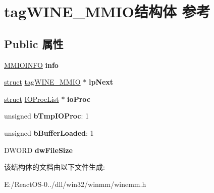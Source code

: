\hypertarget{structtag_w_i_n_e___m_m_i_o}{}\section{tag\+W\+I\+N\+E\+\_\+\+M\+M\+I\+O结构体 参考}
\label{structtag_w_i_n_e___m_m_i_o}
\subsection*{Public 属性}
\begin{DoxyCompactItemize}
\item 
\mbox{\label{structtag_w_i_n_e___m_m_i_o_a99a6dba3a3a52f303c0e2a9f41550c80}} 
\hyperlink{struct___m_m_i_o_i_n_f_o}{M\+M\+I\+O\+I\+N\+FO} {\bfseries info}
\item 
\mbox{\label{structtag_w_i_n_e___m_m_i_o_ac7781eef5dc46f51d9b4cf532d4cc095}} 
\hyperlink{interfacestruct}{struct} \hyperlink{structtag_w_i_n_e___m_m_i_o}{tag\+W\+I\+N\+E\+\_\+\+M\+M\+IO} $\ast$ {\bfseries lp\+Next}
\item 
\mbox{\label{structtag_w_i_n_e___m_m_i_o_a89d8a3e65a45e56b5dde6daab7626a0f}} 
\hyperlink{interfacestruct}{struct} \hyperlink{struct_i_o_proc_list}{I\+O\+Proc\+List} $\ast$ {\bfseries io\+Proc}
\item 
\mbox{\label{structtag_w_i_n_e___m_m_i_o_ab9b2cc44fd8f3af35c3216cf3dccb28f}} 
unsigned {\bfseries b\+Tmp\+I\+O\+Proc}\+: 1
\item 
\mbox{\label{structtag_w_i_n_e___m_m_i_o_a6b0400c076ed2014a4d02431267f7814}} 
unsigned {\bfseries b\+Buffer\+Loaded}\+: 1
\item 
\mbox{\label{structtag_w_i_n_e___m_m_i_o_a3b0e1f7e9384d72d14f09d7e926456af}} 
D\+W\+O\+RD {\bfseries dw\+File\+Size}
\end{DoxyCompactItemize}


该结构体的文档由以下文件生成\+:\begin{DoxyCompactItemize}
\item 
E\+:/\+React\+O\+S-\/0../dll/win32/winmm/winemm.\+h\end{DoxyCompactItemize}
